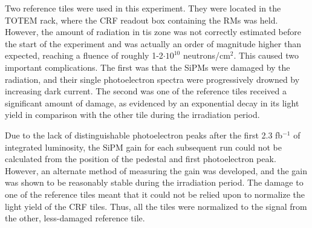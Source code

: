 Two reference tiles were used in this experiment. They were located in the TOTEM rack, where the CRF readout box containing the RMs was held. However, the amount of radiation in tis zone was not correctly estimated before the start of the experiment and was actually an order of magnitude higher than expected, reaching a fluence of roughly 1-2$\cdot10^{10}$ neutrons/cm$^{2}$. This caused two important complications. The first was that the SiPMs were damaged by the radiation, and their single photoelectron spectra were progressively drowned by increasing dark current. The second was one of the reference tiles received a significant amount of damage, as evidenced by an exponential decay in its light yield in comparison with the other tile during the irradiation period.

Due to the lack of distinguishable photoelectron peaks after the first 2.3 fb$^{-1}$ of integrated luminosity, the SiPM gain for each subsequent run could not be calculated from the position of the pedestal and first photoelectron peak. However, an alternate method of measuring the gain was developed, and the gain was shown to be reasonably stable during the irradiation period. The damage to one of the reference tiles meant that it could not be relied upon to normalize the light yield of the CRF tiles. Thus, all the tiles were normalized to the signal from the other, less-damaged reference tile.
